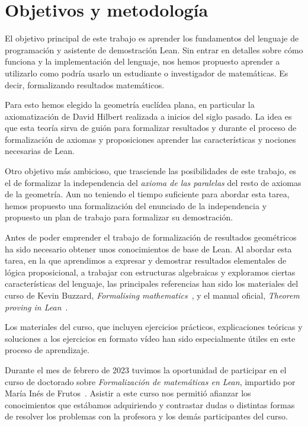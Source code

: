\section{Objetivos y metodolog\'{i}a}

El objetivo principal de este trabajo es aprender los fundamentos del lenguaje
de programación y asistente de demostración Lean. Sin entrar en
detalles sobre cómo funciona y la implementación del lenguaje, nos hemos
propuesto aprender a utilizarlo como podría usarlo un estudiante o investigador de
matemáticas. Es decir, formalizando resultados matemáticos.

Para esto hemos elegido la geometría euclídea plana, en particular la
axiomatización de David Hilbert realizada a inicios del siglo pasado.
La idea es que esta teoría sirva de guión para formalizar resultados y durante
el proceso de formalización de axiomas y proposiciones aprender las
características y nociones necesarias de Lean.

Otro objetivo más ambicioso, que trasciende las posibilidades de este trabajo,
es el de formalizar la independencia del \textit{axioma de las paralelas} del
resto de axiomas de la geometría. Aun no teniendo el tiempo suficiente para
abordar esta tarea, hemos propuesto una formalización del enunciado de la
independencia y propuesto un plan de trabajo para formalizar su demostración.

Antes de poder emprender el trabajo de formalización de resultados geométricos
ha sido necesario obtener unos conocimientos de base de Lean. Al abordar esta
tarea, en la que aprendimos a expresar y demostrar resultados elementales de
lógica proposicional, a trabajar con estructuras algebraicas y exploramos
ciertas características del lenguaje, las principales referencias han sido los
materiales del curso de Kevin Buzzard, \textit{Formalising
	mathematics}~\cite{buzzardFormalisingMathematicsFormalising}, y el manual
oficial, \textit{Theorem proving in Lean}~\cite{avigadLeanTheoremProver}.

Los materiales del curso, que incluyen ejercicios prácticos, explicaciones
teóricas y soluciones a los ejercicios en formato vídeo han sido especialmente
útiles en este proceso de aprendizaje.

Durante el mes de febrero de 2023 tuvimos la oportunidad de participar en el
curso de doctorado sobre \textit{Formalización de matemáticas en Lean},
impartido por María Inés de Frutos~\cite{defrutosFormalizacionMatematicasLean}.
Asistir a este curso nos permitió afianzar los conocimientos que estábamos
adquiriendo y contrastar dudas o distintas formas de resolver los problemas con
la profesora y los demás participantes del curso.

